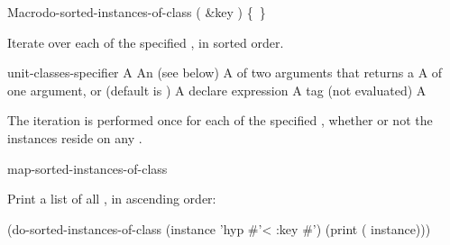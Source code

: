 \documentclass[10pt,twoside,english,pdftex]{article}
\begin{document}
\begin{functiondoc}{Macro}{do-sorted-instances-of-class}%
  {( \&key )
    \mbox{\{ \vbar{} \}\superstar}}
%
%

\fnsyntax

\fnpurpose Iterate over each  of the specified
, in sorted order.

\fnpackage {}

\fnmodule {}

\fnargs
\begin{args}{unit-classes-specifier}
\arg[var] A 
 An 
(see below)
\arg[predicate] A  of two arguments that returns a
\arg[key] A  of one argument, or \nil{} (default is \nil)
\arg[declaration] A declare expression
\arg[tag] A  tag (not evaluated)
\arg[form] A 
\end{args}

\fndsyntax
\W\supp\tabletop
\unitclassesspec
\subclassingspec

\fndescription The iteration is performed once for each 
of the specified , whether or not the instances reside on
any .

\begin{alsos}{map-sorted-instances-of-class}
\end{alsos}

\fnexample
Print a list of all  , in ascending order:
%
\W\supp
\begin{example}
  (do-sorted-instances-of-class (instance 'hyp #'< :key #')
     (print ( instance)))
\end{example} 

\end{functiondoc}

\end{document}
